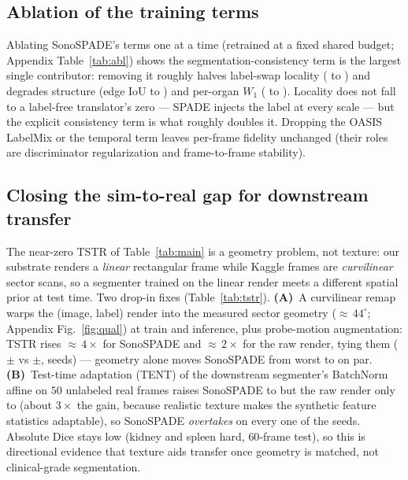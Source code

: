 \documentclass[runningheads]{llncs}
\begin{document}
\subsection{Ablation of the training terms}
Ablating SonoSPADE's terms one at a time (retrained at a fixed shared budget; Appendix
Table~\ref{tab:abl}) shows the segmentation-consistency term is the largest single contributor: removing
it roughly halves label-swap locality (\ablLocFull{} to \ablLocSeg{}) and degrades structure (edge IoU
\ablIouFull{} to \ablIouSeg{}) and per-organ $W_1$ (\ablWFull{} to \ablWSeg{}). Locality does not fall to
a label-free translator's zero --- SPADE injects the label at every scale --- but the explicit
consistency term is what roughly doubles it. Dropping the OASIS LabelMix or the temporal term leaves
per-frame fidelity unchanged (their roles are discriminator regularization and frame-to-frame stability).

\subsection{Closing the sim-to-real gap for downstream transfer}
\label{sec:tstr}
The near-zero TSTR of Table~\ref{tab:main} is a geometry problem, not texture: our substrate renders a
\emph{linear} rectangular frame while Kaggle frames are \emph{curvilinear} sector scans, so a segmenter
trained on the linear render meets a different spatial prior at test time. Two drop-in fixes
(Table~\ref{tab:tstr}). \textbf{(A)}~A curvilinear remap warps the (image, label) render into the
measured sector geometry (${\approx}\,44^{\circ}$; Appendix Fig.~\ref{fig:qual}) at train and inference,
plus probe-motion augmentation: TSTR rises ${\approx}\,4\times$ for SonoSPADE and ${\approx}\,2\times$
for the raw render, tying them (\tstrSonoCurvi{}$\pm$\tstrSonoCurviSd{} vs
\tstrPhysCurvi{}$\pm$\tstrPhysCurviSd{}, \ttaSeeds{} seeds) --- geometry alone moves SonoSPADE from worst
to on par. \textbf{(B)}~Test-time adaptation (TENT) of the downstream segmenter's BatchNorm affine on
$50$ unlabeled real frames raises SonoSPADE to \tstrSonoTent{} but the raw render only to \tstrPhysTent{}
(about $3\times$ the gain, because realistic texture makes the synthetic feature statistics adaptable),
so SonoSPADE \emph{overtakes} on every one of the \ttaSeeds{} seeds. Absolute Dice stays low (kidney and
spleen hard, $60$-frame test), so this is directional evidence that texture aids transfer once geometry
is matched, not clinical-grade segmentation.
\end{document}
